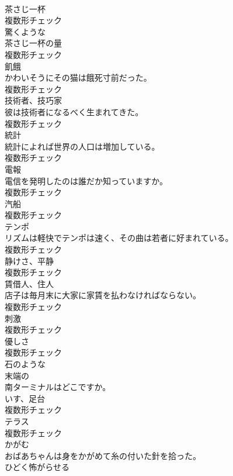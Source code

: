 \documentclass[8pt]{extreport}
\begin{document}
\begin{CJK}{UTF8}{min}
\\	[名詞]	茶さじ一杯	
\\	複数形チェック
\\	[形容詞]	驚くような	
\\	[名詞]	茶さじ一杯の量	
\\	複数形チェック
\\	[名詞]	飢餓	
\\	かわいそうにその猫は餓死寸前だった。	
\\	複数形チェック
\\	[名詞]	技術者、技巧家	
\\	彼は技術者になるべく生まれてきた。	
\\	複数形チェック
\\	[名詞]	統計	
\\	統計によれば世界の人口は増加している。	
\\	複数形チェック
\\	[名詞]	電報	
\\	電信を発明したのは誰だか知っていますか。	
\\	複数形チェック
\\	[名詞]	汽船	
\\	複数形チェック
\\	[名詞]	テンポ	
\\	リズムは軽快でテンポは速く、その曲は若者に好まれている。	
\\	複数形チェック
\\	[名詞]	静けさ、平静	
\\	複数形チェック
\\	[名詞]	賃借人、住人	
\\	店子は毎月末に大家に家賃を払わなければならない。	
\\	複数形チェック
\\	[名詞]	刺激	
\\	複数形チェック
\\	[名詞]	優しさ	
\\	複数形チェック
\\	[形容詞]	石のような	
\\	[形容詞]	末端の	
\\	南ターミナルはどこですか。	
\\	[名詞]	いす、足台	
\\	複数形チェック
\\	[名詞]	テラス	
\\	複数形チェック
\\	[動詞]	かがむ	
\\	おばあちゃんは身をかがめて糸の付いた針を拾った。	
\\	[動詞]	ひどく怖がらせる	

\end{CJK}
\end{document}
